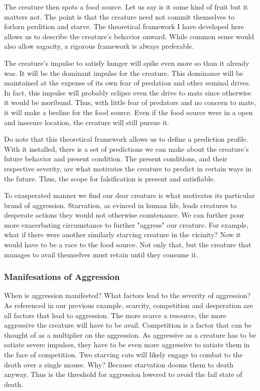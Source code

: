 \documentclass[12pt]{article}
\begin{document}
The creature then spots a food source.
Let us say is it some kind of fruit but it matters not.
The point is that the creature need not commit themselves to forlorn perdition and starve.
The theoretical framework I have developed here allows us to describe the creature's behavior onward.
While common sense would also allow sagacity, a rigorous framework is always preferable.

The creature's impulse to satisfy hunger will spike even more so than it already was.
It will be the dominant impulse for the creature.
This dominance will be maintained at the expense of its own fear of predation and other seminal drives.
In fact, this impulse will probably eclipse even the drive to mate since otherwise it would be moribund.
Thus, with little fear of predators and no concern to mate, it will make a beeline for the food source.
Even if the food source were in a open and insecure location, the creature will still pursue it.

Do note that this theoretical framework allows us to define a prediction profile.
With it installed, there is a set of predictions we can make about the creature's future behavior and present condition.
The present conditions, and their respective severity, are what motivates the creature to predict in certain ways in the future.
Thus, the scope for falsification is present and satisfiable.

To exasperated manner we find our dear creature is what motivates its particular brand of aggression.
Starvation, as evinced in human life, leads creatures to desperate actions they would not otherwise countenance.
We can further pour more exacerbating circumstance to further "aggress" our creature.
For example, what if there were another similarly starving creature in the vicinity?
Now it would have to be a race to the food source.
Not only that, but the creature that manages to avail themselves must retain until they consume it.

\subsubsection{Manifesations of Aggression}
When is aggression manifested?
What factors lead to the severity of aggression?
As referenced in our previous example, scarcity, competition and desperation are all factors that lead to aggression.
The more scarce a resource, the more aggressive the creature will have to be avail.
Competition is a factor that can be thought of as a multiplier on the aggression.
As aggressive as a creature has to be satiate severe impulses, they have to be even more aggressive to satiate them in the face of competition.
Two starving cats will likely engage to combat to the death over a single mouse.
Why?
Because starvation dooms them to death anyway.
Thus is the threshold for aggression lowered to avoid the fail state of death.
\end{document}
